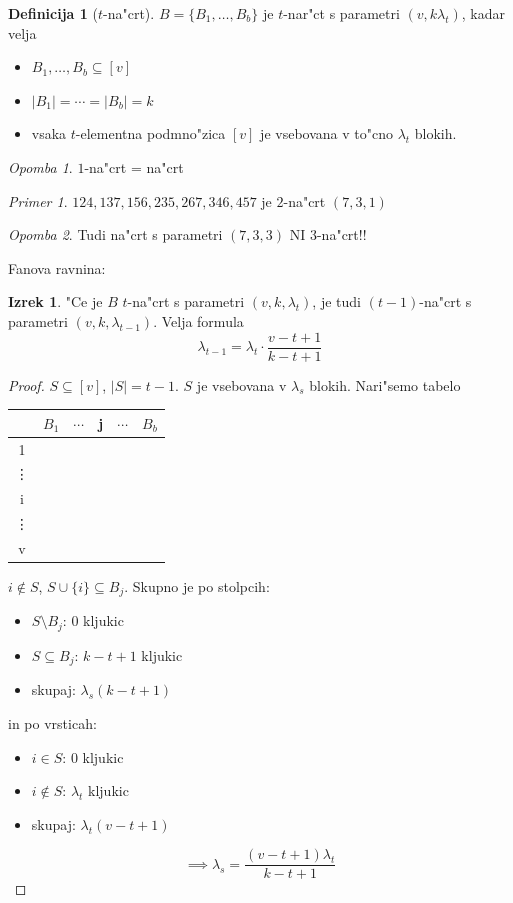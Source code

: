 \documentclass[a4paper,12pt]{article}
\theoremstyle{definition}
\newtheorem{defn}[counter]{Definicija}
\newtheorem{theorem}[counter]{Izrek}
\theoremstyle{remark}
\newtheorem*{ex}{Primer}
\newtheorem*{rem}{Opomba}
\begin{document}
\begin{defn}[$t$-na"crt]
	$B = \{B_1, \ldots, B_b\}$ je $t$-nar"ct s parametri $(v, k \lambda_t)$, kadar velja
	\begin{itemize}
		\item $B_1, \ldots, B_b \subseteq [v]$
		\item $|B_1| = \cdots = |B_b| = k$
		\item vsaka $t$-elementna podmno"zica $[v]$ je vsebovana v to"cno $\lambda_t$ blokih.
	\end{itemize}
\end{defn}
\begin{rem}
	$1$-na"crt = na"crt
\end{rem}
\begin{ex}
	$124, 137, 156, 235, 267, 346, 457$ je $2$-na"crt $(7, 3, 1)$
\end{ex}
\begin{rem}
	Tudi na"crt s parametri $(7, 3, 3)$ NI $3$-na"crt!!
\end{rem}

Fanova ravnina:
\label{TODO: add image 4}

\begin{theorem}
	"Ce je $B$ $t$-na"crt s parametri $(v, k, \lambda_t)$, je tudi $(t-1)$-na"crt s parametri $(v, k, \lambda_{t-1})$. Velja formula
	\[\lambda_{t-1} = \lambda_t \cdot \frac{v - t + 1}{k - t + 1}\]
\end{theorem}

\begin{proof}
	$S \subseteq [v]$, $|S| = t - 1$. $S$ je vsebovana v $\lambda_s$ blokih.
	Nari"semo tabelo
	\begin{center}
		\begin{tabular}{c|c c c c c}
		     & $B_1$ & $\cdots$ & j & $\cdots$ & $B_b$ \\
		\hline
		     1 \\
		     \vdots \\
		     i & & & \checkmark\\
		     \vdots \\
		     v
		\end{tabular}
	\end{center}
	$i \notin S$, $S \cup \{i\} \subseteq B_j$. Skupno je po stolpcih:
	\begin{itemize}
	    \item $S\setminus B_j$: $0$ kljukic
	    \item $S \subseteq B_j$: $k-t+1$ kljukic
	    \item[] skupaj: $\lambda_s (k-t+1)$
	\end{itemize}
	in po vrsticah:
	\begin{itemize}
	    \item $i\in S$: $0$ kljukic
	    \item $i\notin S$: $\lambda_t$ kljukic
	    \item[] skupaj: $\lambda_t (v-t+1)$
	\end{itemize}

	\[\implies \lambda_s = \frac{(v - t + 1)\lambda_t}{k-t+1}\]
\end{proof}
\end{document}
